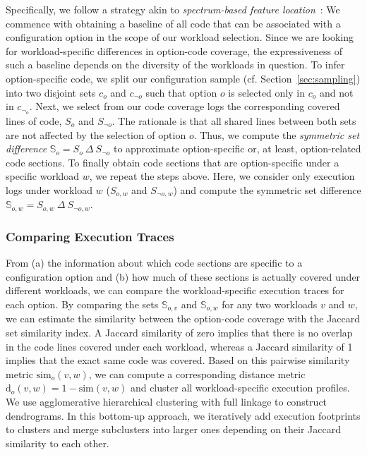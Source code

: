 {{{Specifically, we follow  a strategy akin to  \textit{spectrum-based feature location}~\cite{michelon_spectrum_2021}:
We commence with obtaining a baseline of all code that can be associated with a configuration option in the scope of our workload selection. Since we are looking for workload-specific differences in option-code coverage, the expressiveness of such a baseline depends on the diversity of the workloads in question. To infer option-specific code, we split our configuration sample (cf. Section~\ref{sec:sampling}) into two disjoint sets $c_o$ and $c_{\neg o}$ such that option $o$ is selected only in $c_o$ and not in $c_{\neg_o}$. Next, we select from our code coverage logs the corresponding covered lines of code, $S_o$ and $S_{\neg o}$.  The rationale is that all shared lines between both sets are not affected by the selection of option $o$. Thus, we compute the \textit{symmetric set difference} $\mathbb{S}_o = S_o~\Delta~S_{\neg o}$ to approximate option-specific or, at least, option-related code sections. To finally obtain code sections that are option-specific under a specific workload $w$, we repeat the steps above. Here, we consider only execution logs under workload $w$ ($S_{o, w}$ and $S_{\neg o, w}$) and compute the symmetric set difference $\mathbb{S}_{o,w}=S_{o,w}~\Delta~S_{\neg o, w}.$


\subsubsection{Comparing Execution Traces}
From (a) the information about which code sections are specific to a configuration option and (b) how much of these sections is actually covered under different workloads, we can compare the workload-specific execution traces for each option. By comparing the sets $\mathbb{S}_{o, v}$ and $\mathbb{S}_{o, w}$ for any two workloads $v$ and $w$, we can estimate the similarity between the option-code coverage with the Jaccard set similarity index. A Jaccard similarity of zero implies that there is no overlap in the code lines covered under each workload, whereas a Jaccard similarity of 1 implies that the exact same code was covered. Based on this pairwise similarity metric $\text{sim}_o(v, w)$, we can compute a corresponding distance metric $\text{d}_o(v, w) = 1 - \text{sim}(v, w)$ and cluster all workload-specific execution profiles. 
We use agglomerative hierarchical clustering with full linkage to construct dendrograms. In this bottom-up approach, we iteratively add execution footprints to clusters and merge subclusters into larger ones depending on their Jaccard similarity  to each other. 

}}}
